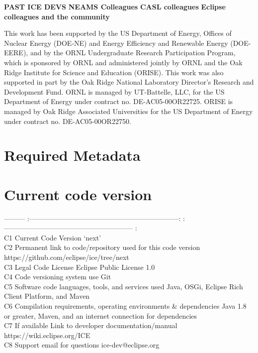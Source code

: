 \textbf{PAST ICE DEVS} \textbf{NEAMS Colleagues} \textbf{CASL
colleagues} \textbf{Eclipse colleagues and the community}

This work has been supported by the US Department of Energy, Offices of
Nuclear Energy (DOE-NE) and Energy Efficiency and Renewable Energy
(DOE-EERE), and by the ORNL Undergraduate Research Participation
Program, which is sponsored by ORNL and administered jointly by ORNL and
the Oak Ridge Institute for Science and Education (ORISE). This work was
also supported in part by the Oak Ridge National Laboratory Director's
Research and Development Fund. ORNL is managed by UT-Battelle, LLC, for
the US Department of Energy under contract no. DE-AC05-00OR22725. ORISE
is managed by Oak Ridge Associated Universities for the US Department of
Energy under contract no. DE-AC05-00OR22750.

\section*{Required Metadata}\label{required-metadata}

\section*{Current code version}\label{current-code-version}

--------- \textbar{}
:-----------------------------------------------------------------:
\textbar{} :-------------------------------------------------------- :
\textbar{}\\C1 \textbar{} Current Code Version \textbar{} `next'
\textbar{}\\C2 \textbar{} Permanent link to code/repository used for
this code version \textbar{} https://github.com/eclipse/ice/tree/next
\textbar{}\\C3 \textbar{} Legal Code License \textbar{} Eclipse Public
License 1.0 \textbar{}\\C4 \textbar{} Code versioning system use
\textbar{} Git \textbar{}\\C5 \textbar{} Software code languages, tools,
and services used \textbar{} Java, OSGi, Eclipse Rich Client Platform,
and Maven \textbar{}\\C6 \textbar{} Compilation requirements, operating
environments \& dependencies \textbar{} Java 1.8 or greater, Maven, and
an internet connection for dependencies \textbar{}\\C7 \textbar{} If
available Link to developer documentation/manual \textbar{}
https://wiki.eclipse.org/ICE \textbar{}\\C8 \textbar{} Support email for
questions \textbar{} ice-dev@eclipse.org \textbar{}

